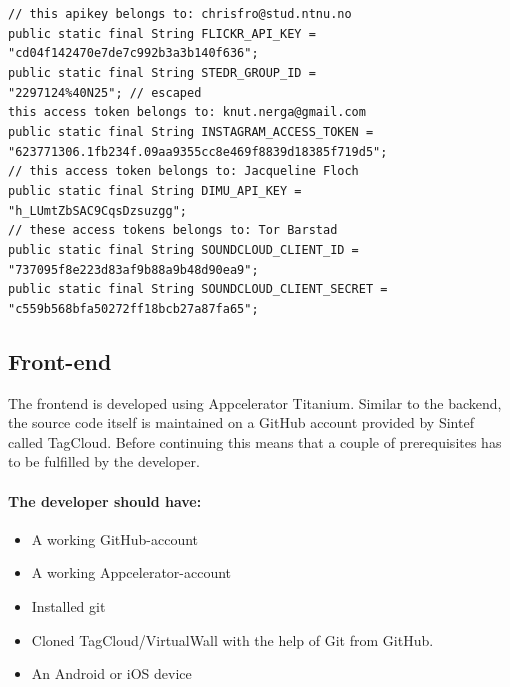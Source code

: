 \texttt{// this apikey belongs to: chrisfro@stud.ntnu.no} \\
\texttt{public static final String FLICKR\_API\_KEY = } \\
\hspace*{4em}\texttt{"cd04f142470e7de7c992b3a3b140f636";} \\
\texttt{public static final String STEDR\_GROUP\_ID =} \\ 
\hspace*{4em}\texttt{"2297124\%40N25"; // escaped} \\
\texttt{this access token belongs to: knut.nerga@gmail.com} \\
\texttt{public static final String INSTAGRAM\_ACCESS\_TOKEN =} \\ 
\hspace*{4em}\texttt{"623771306.1fb234f.09aa9355cc8e469f8839d18385f719d5";} \\
\texttt{// this access token belongs to: Jacqueline Floch} \\
\texttt{public static final String DIMU\_API\_KEY =} \\ 
\hspace*{4em}\texttt{"h\_LUmtZbSAC9CqsDzsuzgg";} \\
\texttt{// these access tokens belongs to: Tor Barstad} \\
\texttt{public static final String SOUNDCLOUD\_CLIENT\_ID =} \\ 
\hspace*{4em}\texttt{"737095f8e223d83af9b88a9b48d90ea9";} \\
\texttt{public static final String SOUNDCLOUD\_CLIENT\_SECRET =} \\ 
\hspace*{4em}\texttt{"c559b568bfa50272ff18bcb27a87fa65";} \\

\subsection{Front-end}

The frontend is developed using Appcelerator Titanium.  Similar to the backend, the source code itself is maintained on a GitHub account provided by Sintef called TagCloud. Before continuing this means that a couple of prerequisites has to be fulfilled by the developer.

\paragraph{The developer should have:}
\begin{itemize}
\item A working GitHub-account 
\item A working Appcelerator-account 
\item Installed git
\item Cloned TagCloud/VirtualWall with the help of Git from GitHub.
\item An Android or iOS device
\end{itemize}  

